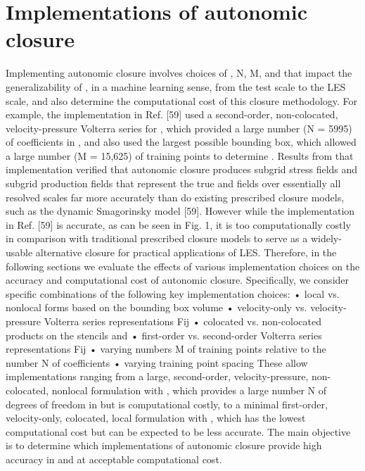 \section{Implementations of autonomic closure }

Implementing autonomic closure involves choices of  , N, M, and   that impact the generalizability of  , in a machine learning sense, from the test scale to the LES scale, and also determine the computational cost of this closure methodology. For example, the implementation in Ref. [59] used a second-order, non-colocated, velocity-pressure Volterra series for  , which provided a large number (N = 5995) of coefficients   in  , and also used the largest possible bounding box, which allowed a large number (M  = 15,625) of training points to determine  . Results from that implementation verified that autonomic closure produces subgrid stress fields   and subgrid production fields   that represent the true   and   fields over essentially all resolved scales far more accurately than do existing prescribed closure models, such as the dynamic Smagorinsky model [59]. 
However while the implementation in Ref. [59] is accurate, as can be seen in Fig. 1, it is too computationally costly in comparison with traditional prescribed closure models to serve as a widely-usable alternative closure for practical applications of LES. Therefore, in the following sections we evaluate the effects of various implementation choices on the accuracy and computational cost of autonomic closure. Specifically, we consider specific combinations of the following key implementation choices: 
•	local vs. nonlocal forms based on the bounding box volume   
•	velocity-only vs. velocity-pressure Volterra series representations Fij
•	colocated vs. non-colocated products on the stencils   and  
•	first-order vs. second-order Volterra series representations Fij
•	varying numbers M of training points relative to the number N of coefficients  
•	varying training point spacing  
These allow implementations ranging from a large, second-order, velocity-pressure, non-colocated, nonlocal formulation with  , which provides a large number N of degrees of freedom in   but is computational costly, to a minimal first-order, velocity-only, colocated, local formulation with  , which has the lowest computational cost but can be expected to be less accurate. The main objective is to determine which implementations of autonomic closure provide high accuracy in   and   at acceptable computational cost.
